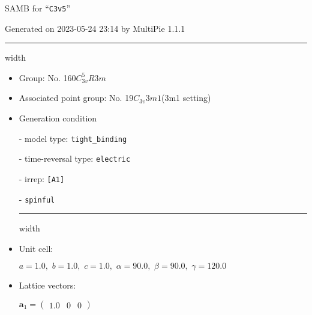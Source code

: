 \documentclass[fleqn,10pt,landscape]{article}
\begin{document}
\setcounter{MaxMatrixCols}{16}

\setlength{\baselineskip}{16pt}
\footnotesize
\begin{center}
\LARGE
SAMB for ``\texttt{C3v5}''
\end{center}
\begin{flushright}
Generated on 2023-05-24 23:14 by MultiPie 1.1.1
\end{flushright}
\vspace{1cm}


 \hfil \hrule height 1mm width \textwidth \hfil

\begin{itemize}
\item Group: No. 160\quad$C_{3v}^{5}$\quad$R3m$\quad[ trigonal ]

\item Associated point group: No. 19\quad$C_{3v}$\quad$3m1$\quad(3m1 setting)\quad[ trigonal ]

\vspace{5mm}

\item Generation condition

\quad - model type: \texttt{tight_binding}

\quad - time-reversal type: \texttt{electric}

\quad - irrep: \texttt{[A1]}

\quad - \texttt{spinful}


 \hfil \hrule height 1mm width \textwidth \hfil

\item Unit cell:

\quad $a=1.0,\,\, b=1.0,\,\, c=1.0,\,\, \alpha=90.0,\,\, \beta=90.0,\,\, \gamma=120.0$

\item Lattice vectors:

\quad $\bm{a}_1=\begin{pmatrix} 1.0 & 0 & 0 \end{pmatrix}$


\end{itemize}
\end{document}
